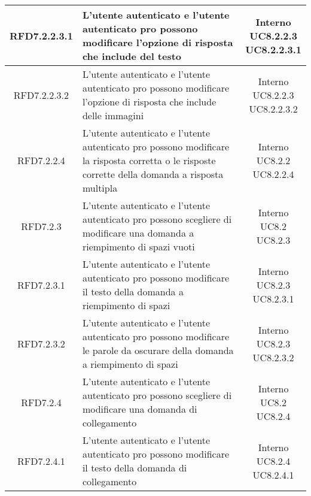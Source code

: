 \begin{longtable}{|c|>{\centering}m{7cm}|c|}
			 \hypertarget{{RFD7.2.2.3.1}}{{RFD7.2.2.3.1}} & L’utente autenticato e l’utente
autenticato pro possono modificare
l’opzione di risposta che include del testo & \makecell{Interno\\ UC8.2.2.3 \\UC8.2.2.3.1 } \\ \hline
			 \hypertarget{{RFD7.2.2.3.2}}{{RFD7.2.2.3.2}} & L’utente autenticato e l’utente
autenticato pro possono modificare
l’opzione di risposta che include delle
immagini & \makecell{Interno\\ UC8.2.2.3 \\UC8.2.2.3.2 } \\ \hline
			 \hypertarget{{RFD7.2.2.4}}{{RFD7.2.2.4}} & L’utente autenticato e l’utente
autenticato pro possono modificare la
risposta corretta o le risposte corrette
della domanda a risposta multipla & \makecell{Interno\\ UC8.2.2 \\UC8.2.2.4 } \\ \hline
			 \hypertarget{{RFD7.2.3}}{{RFD7.2.3}} & L’utente autenticato e l’utente
autenticato pro possono scegliere di
modificare una domanda a riempimento
di spazi vuoti & \makecell{Interno\\ UC8.2 \\UC8.2.3 } \\ \hline
			 \hypertarget{{RFD7.2.3.1}}{{RFD7.2.3.1}} & L’utente autenticato e l’utente
autenticato pro possono modificare il
testo della domanda a riempimento di
spazi & \makecell{Interno\\ UC8.2.3 \\UC8.2.3.1 } \\ \hline
			 \hypertarget{{RFD7.2.3.2}}{{RFD7.2.3.2}} & L’utente autenticato e l’utente
autenticato pro possono modificare le
parole da oscurare della domanda a
riempimento di spazi & \makecell{Interno\\ UC8.2.3 \\UC8.2.3.2 } \\ \hline
			 \hypertarget{{RFD7.2.4}}{{RFD7.2.4}} & L’utente autenticato e l’utente
autenticato pro possono scegliere di
modificare una domanda di collegamento & \makecell{Interno\\ UC8.2 \\UC8.2.4 } \\ \hline
			 \hypertarget{{RFD7.2.4.1}}{{RFD7.2.4.1}} & L’utente autenticato e l’utente
autenticato pro possono modificare il
testo della domanda di collegamento & \makecell{Interno\\ UC8.2.4 \\UC8.2.4.1 } \\ \hline

\end{longtable}
